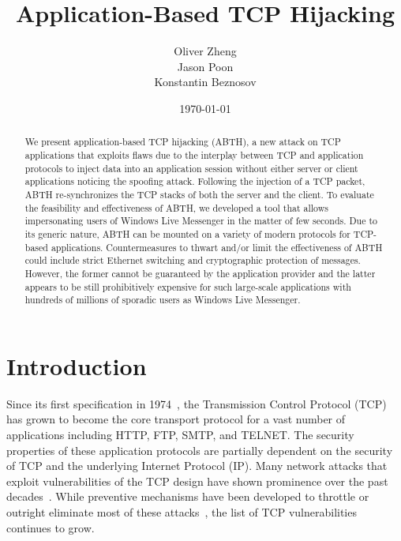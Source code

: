 \documentclass{sig-alternate}
\begin{document}

\title{
Application-Based TCP Hijacking
}

\author {
	\alignauthor
	Oliver Zheng\\
	\alignauthor
	Jason Poon\\
	\alignauthor
	Konstantin Beznosov\\
}

\date{\today}

\maketitle

\begin{abstract}
We present application-based TCP hijacking (ABTH), a new attack on TCP applications that exploits flaws due to the interplay between TCP and application protocols to inject data into an application session without either server or client applications noticing the spoofing attack. 
Following the injection of a TCP packet, ABTH re-synchronizes the TCP stacks of both the server and the client.
To evaluate the feasibility and effectiveness of ABTH, we developed a tool that allows impersonating users of Windows Live Messenger in the matter of few seconds. 
Due to its generic nature, ABTH can be mounted on a variety of modern protocols for TCP-based applications.
Countermeasures to thwart and/or limit the effectiveness of ABTH could include strict Ethernet switching and cryptographic protection of messages. However, the former cannot be guaranteed by the application provider and the latter appears to be still prohibitively expensive for such large-scale applications with hundreds of millions of sporadic users as Windows Live Messenger.
\end{abstract}



\section{Introduction}

Since its first specification in 1974~\cite{rfc:tcp}, the Transmission Control Protocol (TCP) has grown to become the core transport protocol for a vast number of applications including HTTP, FTP, SMTP, and TELNET.
The security properties of these application protocols are partially dependent on the security of TCP and the underlying Internet Protocol (IP).
Many network attacks that exploit vulnerabilities of the TCP design have shown prominence over the past decades~\cite{harris:tcpattacks}.
While preventive mechanisms have been developed to throttle or outright eliminate most of these attacks~\cite{dubrawsky:layer2}, the list of TCP vulnerabilities continues to grow.
\end{document}
